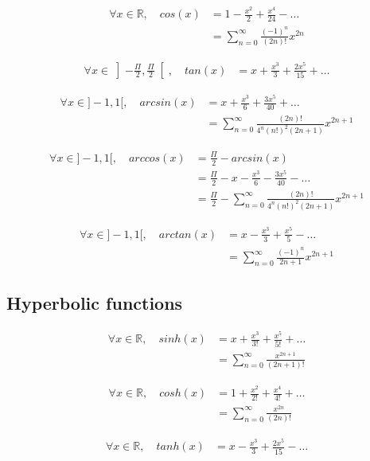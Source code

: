 \documentclass[hidelinks]{article}
\newenvironment{nalign}{
    \begin{equation}
    \begin{aligned}
}{
    \end{aligned}
    \end{equation}
    \ignorespacesafterend
}
\begin{document}
     \begin{nalign}
    \forall x \in \mathbb{R}, \quad cos(x) &= 1 - \frac{x^2}{2} + \frac{x^4}{24} - \dots \\
    &= \sum_{n=0}^{\infty}\frac{(-1)^n}{(2n)!}x^{2n}
    \end{nalign}
    
    \begin{nalign}
    \forall x \in \left]-\frac{\Pi}{2},\frac{\Pi}{2}\right[, \quad tan(x) &= x + \frac{x^3}{3} + \frac{2x^5}{15} + \dots
    \end{nalign}
    
    \begin{nalign}
    \forall x \in ]-1,1[, \quad arcsin(x) &= x + \frac{x^3}{6} + \frac{3x^5}{40} + \dots \\
    &= \sum_{n=0}^{\infty}\frac{(2n)!}{4^n (n!)^2 (2n+1)}x^{2n+1}
    \end{nalign}
    
    \begin{nalign}
    \forall x \in ]-1,1[, \quad arccos(x) &= \frac{\Pi}{2} - arcsin(x) \\
    & = \frac{\Pi}{2} - x - \frac{x^3}{6} - \frac{3x^5}{40} - \dots \\
    &= \frac{\Pi}{2} - \sum_{n=0}^{\infty}\frac{(2n)!}{4^n (n!)^2 (2n+1)}x^{2n+1}
    \end{nalign}
    
    \begin{nalign}
    \forall x \in ]-1,1[, \quad arctan(x) &= x - \frac{x^3}{3} + \frac{x^5}{5} - \dots \\
    &= \sum_{n=0}^{\infty}\frac{(-1)^n}{2n+1}x^{2n+1}
    \end{nalign}
    
    \subsection{Hyperbolic functions}
    
    \begin{nalign}
    \forall x \in \mathbb{R}, \quad sinh(x) &= x + \frac{x^3}{3!} + \frac{x^5}{5!} + \dots \\
    &= \sum_{n=0}^{\infty}\frac{x^{2n+1}}{(2n+1)!}
    \end{nalign}
    
    \begin{nalign}
    \forall x \in \mathbb{R}, \quad cosh(x) &= 1 + \frac{x^2}{2!} + \frac{x^4}{4!} + \dots \\
    &= \sum_{n=0}^{\infty}\frac{x^{2n}}{(2n)!}
    \end{nalign}
    
    \begin{nalign}
    \forall x \in \mathbb{R}, \quad tanh(x) &= x - \frac{x^3}{3} + \frac{2x^5}{15} - \dots 
    \end{nalign}
\end{document}
